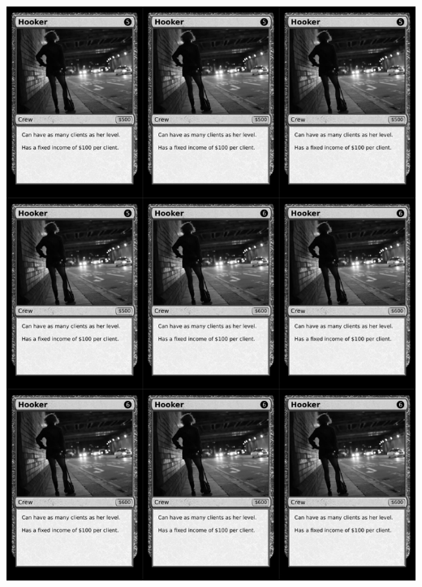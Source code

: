 \documentclass[a4paper]{article}
\begin{document}
\newpage

\begin{center}
	\centering
	\includegraphics[width=200.5mm,height=280.7mm]{output/temp/page15.png}
\end{center}
\end{document}
